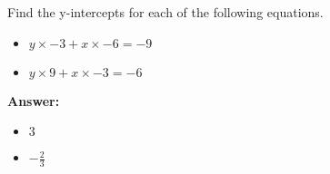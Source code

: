  Find the y-intercepts for each of the following equations. \begin{itemize}\item \( y \times -3 + x \times -6 = -9 \)\item \( y \times 9 + x \times -3 = -6 \)\end{itemize}

        \textbf{Answer:} \begin{itemize}\item \( 3 \)\item \( -\frac{2}{3} \)\end{itemize}
